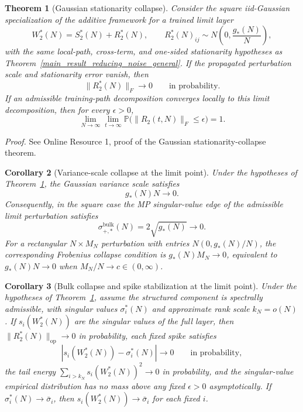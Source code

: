 \documentclass[11pt]{article}
\theoremstyle{plain}
\newtheorem{thm}{Theorem}[section]
\newtheorem{cor}[thm]{Corollary}
\theoremstyle{definition}
\theoremstyle{remark}
\newcommand{\PP}{\mathbb{P}}
\newcommand{\op}{\mathrm{op}}
\newcommand{\1}{\mathbf{1}}
\newcommand{\proofloc}[1]{\par\noindent\emph{Proof.} #1\par}
\begin{document}
\begin{thm}[Gaussian stationarity collapse]
\label{thm:main_gaussian_stationarity_collapse}
Consider the square iid-Gaussian specialization of the additive framework for a trained limit layer
\[
W_2^*(N)=S_2^*(N)+R_2^*(N),
\qquad
R_2^*(N)_{ij}\sim N\!\left(0,\frac{g_*(N)}{N}\right),
\]
with the same local-path, cross-term, and one-sided stationarity hypotheses as Theorem~\ref{main_result_reducing_noise_general}. If the propagated perturbation scale and stationarity error vanish, then
\[
\|R_2^*(N)\|_F\to0
\qquad\text{in probability.}
\]
If an admissible training-path decomposition converges locally to this limit decomposition, then for every \(\epsilon>0\),
\[
\lim_{N\to\infty}\lim_{t\to\infty}
\PP\big(\|R_2(t,N)\|_F\le\epsilon\big)=1.
\]
\end{thm}
\proofloc{See Online Resource 1, proof of the Gaussian stationarity-collapse theorem.}

\begin{cor}[Variance-scale collapse at the limit point]
\label{cor:main_variance_scale_collapse}
Under the hypotheses of Theorem~\ref{thm:main_gaussian_stationarity_collapse}, the Gaussian variance scale satisfies
\[
g_*(N)N\to0.
\]
Consequently, in the square case the MP singular-value edge of the admissible limit perturbation satisfies
\[
\sigma_{+,*}^{\mathrm{bulk}}(N)=2\sqrt{g_*(N)}\to0.
\]
For a rectangular \(N\times M_N\) perturbation with entries \(N(0,g_*(N)/N)\), the corresponding Frobenius collapse condition is \(g_*(N)M_N\to0\), equivalent to \(g_*(N)N\to0\) when \(M_N/N\to c\in(0,\infty)\).
\end{cor}

\begin{cor}[Bulk collapse and spike stabilization at the limit point]
\label{cor:main_bulk_collapse_spike_stabilization}
Under the hypotheses of Theorem~\ref{thm:main_gaussian_stationarity_collapse}, assume the structured component is spectrally admissible, with singular values \(\sigma_i^*(N)\) and approximate rank scale \(k_N=o(N)\). If \(s_i(W_2^*(N))\) are the singular values of the full layer, then \(\|R_2^*(N)\|_{\op}\to0\) in probability, each fixed spike satisfies
\[
|s_i(W_2^*(N))-\sigma_i^*(N)|\to0
\qquad\text{in probability},
\]
the tail energy \(\sum_{i>k_N}s_i(W_2^*(N))^2\to0\) in probability, and the singular-value empirical distribution has no mass above any fixed \(\epsilon>0\) asymptotically. If \(\sigma_i^*(N)\to\bar\sigma_i\), then \(s_i(W_2^*(N))\to\bar\sigma_i\) for each fixed \(i\).
\end{cor}
\end{document}
